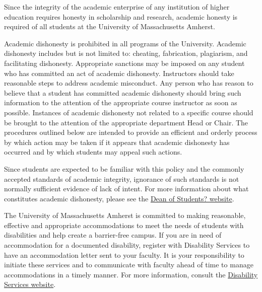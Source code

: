 \documentclass[10pt]{article}
\begin{document}
{\footnotesize 
  
\bigskip
{}
Since the integrity of the academic enterprise of any institution of higher education requires honesty in scholarship and research, academic honesty is required of all students at the University of Massachusetts Amherst.

Academic dishonesty is prohibited in all programs of the University. Academic dishonesty includes but is not limited to: cheating, fabrication, plagiarism, and facilitating dishonesty. Appropriate sanctions may be imposed on any student who has committed an act of academic dishonesty. Instructors should take reasonable steps to address academic misconduct. Any person who has reason to believe that a student has committed academic dishonesty should bring such information to the attention of the appropriate course instructor as soon as possible. Instances of academic dishonesty not related to a specific course should be brought to the attention of the appropriate department Head or Chair. The procedures outlined below are intended to provide an efficient and orderly process by which action may be taken if it appears that academic dishonesty has occurred and by which students may appeal such actions.

Since students are expected to be familiar with this policy and the commonly accepted standards of academic integrity, ignorance of such standards is not normally sufficient evidence of lack of intent.
For more information about what constitutes academic dishonesty, please see the \href{http://umass.edu/dean_students/codeofconduct/acadhonesty/}{Dean of Students? website}.

}

{\footnotesize 
\bigskip
{}
The University of Massachusetts Amherst is committed to making reasonable, effective and appropriate accommodations to meet the needs of students with disabilities and help create a barrier-free campus. If you are in need of accommodation for a documented disability, register with Disability Services to have an accommodation letter sent to your faculty. It is your responsibility to initiate these services and to communicate with faculty ahead of time to manage accommodations in a timely manner. For more information, consult the \href{http://www.umass.edu/disability/}{Disability Services website}.
}
\end{document}
